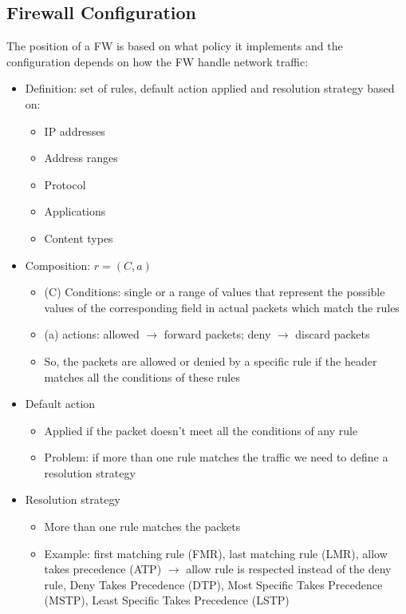 \documentclass{article}
\begin{document}
\subsection{Firewall Configuration}
The position of a FW is based on what policy it implements and the configuration depends on how the FW handle network traffic:
  \begin{itemize}
        \item Definition: set of rules, default action applied and resolution strategy based on:
          \begin{itemize}
            \item IP addresses
            \item Address ranges
            \item Protocol
            \item Applications
            \item Content types
          \end{itemize}
        \item Composition: \(r = (C, a)\) 
          \begin{itemize}
            \item (C) Conditions: single or a range of values that represent the possible values of the corresponding field in actual packets which match the rules
            \item (a) actions: allowed $\rightarrow$ forward packets; deny $\rightarrow$ discard packets
            \item So, the packets are allowed or denied by a specific rule if the header matches all the conditions of these rules
          \end{itemize}
        \item Default action
          \begin{itemize}
            \item Applied if the packet doesn’t meet all the conditions of any rule
            \item Problem: if more than one rule matches the traffic we need to define a resolution strategy
          \end{itemize}
        \item Resolution strategy
          \begin{itemize}
            \item More than one rule matches the packets
            \item Example: first matching rule (FMR), last matching rule (LMR), allow takes precedence (ATP) $\rightarrow$ allow rule is respected instead of the deny rule, Deny Takes Precedence (DTP), Most Specific Takes Precedence (MSTP), Least Specific Takes Precedence (LSTP)

\end{itemize}
\end{itemize}
\end{document}
